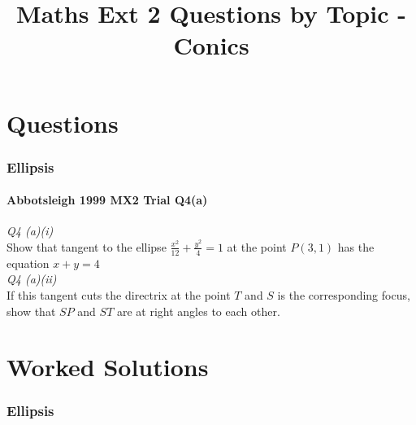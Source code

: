 \documentclass[11pt,a4paper]{article}
\title{Maths Ext 2 Questions by Topic - Conics}
\author{}
\date{}
\begin{document}
\maketitle
\part*{Questions}
\section{Ellipsis}
\subsection{Abbotsleigh 1999 MX2 Trial Q4(a)}
\textit{Q4 (a)(i)}\\[1em]
Show that tangent to the ellipse $\displaystyle\frac{{{x^2}}}{{12}} + 
\frac{{{y^2}}}{4} = 1$ at the point $P\left( {3,1} \right)$ has the equation $x 
+ y = 4$\\[1em]
\textit{Q4 (a)(ii)}\\[1em]
If this tangent cuts the directrix at the point $T$ and $S$ is the corresponding focus, show that $SP$ and $ST$ are at right angles to each 
other.\\

\part{Worked Solutions}
\section*{Ellipsis}
\end{document}

